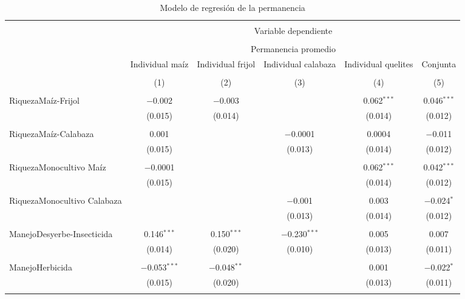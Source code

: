 \documentclass[spanish,11pt]{article}
\begin{document}
\begin{table}[!htbp] \centering 
  \caption{Modelo de regresión de la permanencia} 
  \label{} 
\begin{tabular}{@{\extracolsep{5pt}}lccccc} 
\\[-1.8ex]\hline 
\hline \\[-1.8ex] 
 & \multicolumn{5}{c}{Variable dependiente} \\ 
\cline{2-6} 
\\[-1.8ex] & \multicolumn{5}{c}{Permanencia promedio} \\ 
 & Individual maíz & Individual frijol & Individual calabaza & Individual quelites & Conjunta \\ 
\\[-1.8ex] & (1) & (2) & (3) & (4) & (5)\\ 
\hline \\[-1.8ex] 
 RiquezaMaíz-Frijol & $-$0.002 & $-$0.003 &  & 0.062$^{***}$ & 0.046$^{***}$ \\ 
  & (0.015) & (0.014) &  & (0.014) & (0.012) \\ 
  & & & & & \\ 
 RiquezaMaíz-Calabaza & 0.001 &  & $-$0.0001 & 0.0004 & $-$0.011 \\ 
  & (0.015) &  & (0.013) & (0.014) & (0.012) \\ 
  & & & & & \\ 
 RiquezaMonocultivo Maíz & $-$0.0001 &  &  & 0.062$^{***}$ & 0.042$^{***}$ \\ 
  & (0.015) &  &  & (0.014) & (0.012) \\ 
  & & & & & \\ 
 RiquezaMonocultivo Calabaza &  &  & $-$0.001 & 0.003 & $-$0.024$^{*}$ \\ 
  &  &  & (0.013) & (0.014) & (0.012) \\ 
  & & & & & \\ 
 ManejoDesyerbe-Insecticida & 0.146$^{***}$ & 0.150$^{***}$ & $-$0.230$^{***}$ & 0.005 & 0.007 \\ 
  & (0.014) & (0.020) & (0.010) & (0.013) & (0.011) \\ 
  & & & & & \\ 
 ManejoHerbicida & $-$0.053$^{***}$ & $-$0.048$^{**}$ &  & 0.001 & $-$0.022$^{*}$ \\ 
  & (0.015) & (0.020) &  & (0.013) & (0.011) \\ 
  & & & & & \\ 

\end{tabular}
\end{table}
\end{document}
